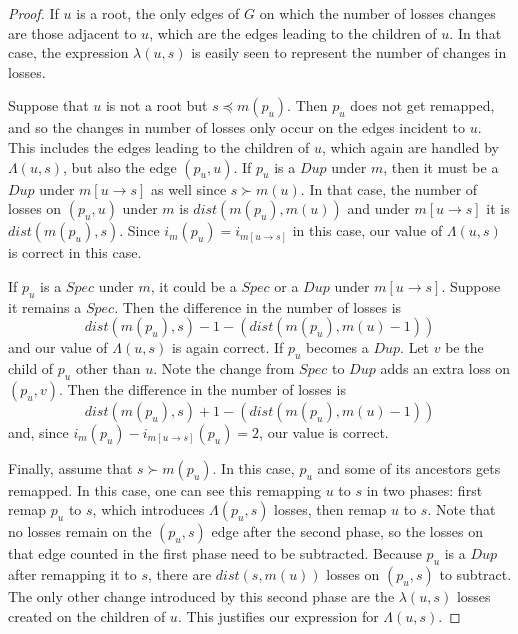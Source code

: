 \documentclass[10pt]{article}
\begin{document}
\begin{proof}
    If $u$ is a root, the only edges of $G$ on which the number of losses changes are those adjacent to $u$, which are the edges leading to the children of $u$.  In that case, the expression $\lambda(u, s)$ is easily seen to represent the number of changes in losses.
    
    Suppose that $u$ is not a root but $s \preceq m(p_u)$.  Then $p_u$ does not get remapped, and so the changes in number of losses only occur on the edges incident to $u$.  This includes the edges leading to the children of $u$, which again are handled by $\Lambda(u, s)$, but also the edge $(p_u, u)$.  
    If $p_u$ is a $Dup$ under $m$, then it must be a $Dup$ under $m[u \rightarrow s]$ as well since $s \succ m(u)$.
    In that case, the number of losses on $(p_u, u)$ under $m$ is $dist(m(p_u), m(u))$ and under $m[u \rightarrow s]$ it is $dist(m(p_u), s)$.  Since $i_m(p_u) = i_{m[u \rightarrow s]}$ in this case, our value of $\Lambda(u, s)$ is correct in this case. 

    If $p_u$ is a $Spec$ under $m$, it could be a $Spec$ or a $Dup$ under $m[u \rightarrow s]$.
    Suppose it remains a $Spec$.  
    Then the difference in the number of losses is 
    \[
    dist(m(p_u), s) - 1 - (dist(m(p_u), m(u) - 1))
    \]
    and our value of $\Lambda(u, s)$ is again correct.
    If $p_u$ becomes a $Dup$.  Let $v$ be the child of $p_u$ other than $u$.  Note the change from $Spec$ to $Dup$ adds an extra loss on $(p_u, v)$. 
    Then the difference in the number of losses is 
    \[
    dist(m(p_u), s) + 1 - (dist(m(p_u), m(u) - 1))
    \] 
    and, since $i_m(p_u) - i_{m[u \rightarrow s]}(p_u) = 2$, our value is correct.

    Finally, assume that $s \succ m(p_u)$. In this case, $p_u$ and some of its ancestors gets remapped.  In this case, one can see this remapping $u$ to $s$ in two phases: first remap $p_u$ to $s$, which introduces $\Lambda(p_u, s)$ losses, then remap $u$ to $s$.  Note that no losses remain on the $(p_u, s)$ edge after the second phase, so the losses on that edge counted in the first phase need to be subtracted.  Because $p_u$ is a $Dup$ after remapping it to $s$, there are $dist(s, m(u))$ losses on $(p_u, s)$ to subtract.  The only other change introduced by this second phase are the $\lambda(u, s)$ losses created on the children of $u$.  
    This justifies our expression for $\Lambda(u, s)$.
\end{proof}
\end{document}
